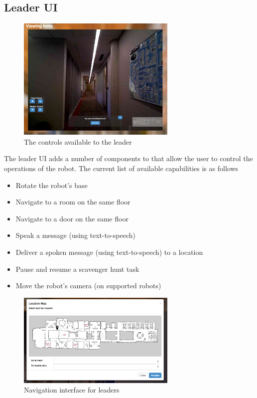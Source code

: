 \documentclass[
  oneside,
  11pt, a4paper,
  footinclude=true,
  headinclude=true,
  cleardoublepage=empty
]{article}
\begin{document}
\subsection{Leader UI}

\begin{figure}
\centering
\includegraphics[width=3in]{leader_ui}
\caption{The controls available to the leader}
\end{figure}

The leader UI adds a number of components to that allow the user to
control the operations of the robot. The current list of available capabilities
is as follows

\begin{itemize}
  \item Rotate the robot's base
  \item Navigate to a room on the same floor
  \item Navigate to a door on the same floor
  \item Speak a message (using text-to-speech)
  \item Deliver a spoken message (using text-to-speech) to a location
  \item Pause and resume a scavenger hunt task
  \item Move the robot's camera (on supported robots)
\end{itemize}

\begin{figure}
\centering
\includegraphics[width=3in]{nav_ui}
\caption{Navigation interface for leaders}
\end{figure}
\end{document}
